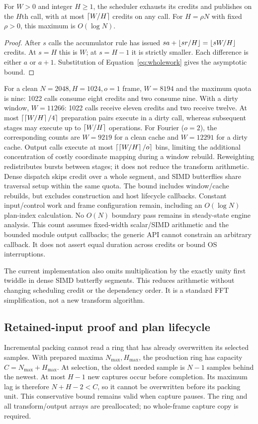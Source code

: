 \begin{proposition}
For $W>0$ and integer $H\ge1$, the scheduler exhausts its credits and
publishes on the $H$th call, with at most $\left\lceil W/H\right\rceil$ credits on any call.
For $H=\rho N$ with fixed $\rho>0$, this maximum is $O(\log N)$.
\end{proposition}
\begin{proof}
After $s$ calls the accumulator rule has issued
$sa+\left\lfloor sr/H\right\rfloor=\left\lfloor sW/H\right\rfloor$ credits. At $s=H$ this is $W$;
at $s=H-1$ it is strictly smaller. Each difference is either $a$ or $a+1$.
Substitution of Equation~\eqref{eq:wholework} gives the asymptotic bound.
\end{proof}
For a clean $N=2048,H=1024,o=1$ frame, $W=8194$ and the maximum quota is nine:
1022 calls consume eight credits and two consume nine. With a dirty window,
$W=11266$: 1022 calls receive eleven credits and two receive twelve.
At most $\left\lceil \left\lceil W/H\right\rceil/4\right\rceil$ preparation pairs execute in a dirty call,
whereas subsequent stages may execute up to $\left\lceil W/H\right\rceil$ operations.
For Fourier ($o=2$), the corresponding counts are $W=9219$ for a clean cache
and $W=12291$ for a dirty cache. Output calls execute at most
$\left\lceil \left\lceil W/H\right\rceil/o\right\rceil$ bins, limiting the additional concentration of costly
coordinate mapping during a window rebuild. Reweighting redistributes bursts
between stages; it does not reduce the transform arithmetic. Dense dispatch skips
credit over a whole segment, and SIMD butterflies share traversal setup
within the same quota. The bound includes window/cache
rebuilds, but excludes construction and host lifecycle callbacks. Constant
input/control work and frame configuration remain, including an $O(\log N)$
plan-index calculation. No $O(N)$ boundary pass remains in steady-state engine
analysis. This count assumes fixed-width scalar/SIMD arithmetic and the bounded
module output callbacks; the generic API cannot constrain an arbitrary callback.
It does not assert equal duration across credits or bound OS interruptions.

The current implementation also omits multiplication by the exactly unity
first twiddle in dense SIMD butterfly segments. This reduces arithmetic
without changing scheduling credit or the dependency order. It is a standard
FFT simplification, not a new transform algorithm.

\subsection{Retained-input proof and plan lifecycle}
Incremental packing cannot read a ring that has already overwritten its
selected samples. With prepared maxima $N_{\max},H_{\max}$, the production
ring has capacity $C=N_{\max}+H_{\max}$. At selection, the oldest needed sample
is $N-1$ samples behind the newest. At most $H-1$ new captures occur before
completion. Its maximum lag is therefore $N+H-2<C$, so it cannot be
overwritten before its packing unit. This conservative bound remains valid
when capture pauses. The ring and all transform/output arrays are preallocated;
no whole-frame capture copy is required.

